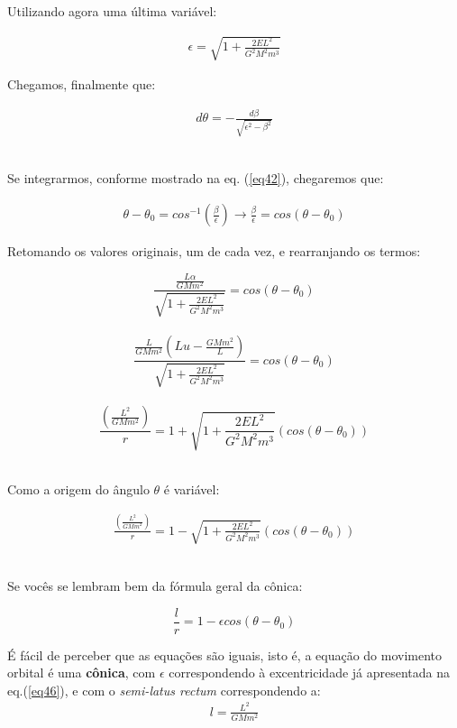Utilizando agora uma última variável:

\begin{eqnarray}
	\epsilon = \sqrt{1 + \frac{2EL^2}{G^2M^2m^3}} \label{eq46}
\end{eqnarray}

Chegamos, finalmente que:

\begin{eqnarray}
	d\theta = -\frac{d\beta}{\sqrt{\epsilon^2 - \beta^2}} \label{eq47}
\end{eqnarray} {\\}

Se integrarmos, conforme mostrado na eq. (\ref{eq42}), chegaremos que:

\begin{eqnarray}
	\theta - \theta_0 = cos^{-1}\left(\frac{\beta}{\epsilon}\right) \rightarrow \frac{\beta}{\epsilon} = cos(\theta - \theta_0) \label{eq48}
\end{eqnarray}

Retomando os valores originais, um de cada vez, e rearranjando os termos:

\[
	\frac{\frac{L\alpha}{GMm^2}}{\sqrt{1 + \frac{2EL^2}{G^2M^2m^3}}} =  cos(\theta - \theta_0)
\] {\\}
\[
	\frac{\frac{L}{GMm^2}\left(Lu-\frac{GMm^2}{L}\right)}{\sqrt{1 + \frac{2EL^2}{G^2M^2m^3}}} =  cos(\theta - \theta_0)
\] {\\}
\[
	\frac{\left(\frac{L^2}{GMm^2}\right)}{r} = 1 + \sqrt{1 + \frac{2EL^2}{G^2M^2m^3}}(cos(\theta - \theta_0))
\]{\\}

Como a origem do ângulo $\theta$ é variável:

\begin{eqnarray}
	\frac{\left(\frac{L^2}{GMm^2}\right)}{r} = 1 - \sqrt{1 + \frac{2EL^2}{G^2M^2m^3}}(cos(\theta - \theta_0)) \label{eq49}
\end{eqnarray}{\\}

Se vocês se lembram bem da fórmula geral da cônica:

\[
	\frac{l}{r} = 1-\epsilon cos(\theta - \theta_0)
\] 

É fácil de perceber que as equações são iguais, isto é, a equação do movimento orbital é uma \textbf{cônica}, com $\epsilon$ correspondendo à excentricidade já apresentada na eq.(\ref{eq46}), e com o \textit{semi-latus rectum} correspondendo a:
\begin{eqnarray}
	l = \frac{L^2}{GMm^2} \label{eq50}
\end{eqnarray}

